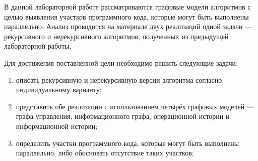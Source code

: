 

В данной лабораторной работе рассматриваются графовые модели алгоритмов с целью выявления участков программного кода, которые могут быть выполнены параллельно. Анализ проводится на материале двух реализаций одной задачи --- рекурсивного и нерекурсивного алгоритмов, полученных из предыдущей лабораторной работы.

Для достижения поставленной цели необходимо решить следующие задачи:
\begin{enumerate}
	\item описать рекурсивную и нерекурсивную версии алгоритма согласно индивидуальному варианту;
	\item представить обе реализации с использованием четырёх графовых моделей --- графа управления, информационного графа, операционной истории и информационной истории;
	\item определить участки программного кода, которые могут быть выполнены параллельно, либо обосновать отсутствие таких участков;
\end{enumerate}




\clearpage


